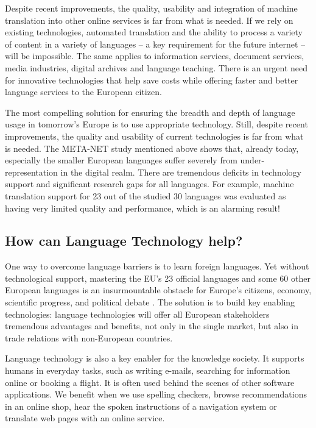 \documentclass[10pt, plain]{../../metanetpaper}
\begin{document}
\begin{multicols}{2}
Despite recent improvements, the quality, usability and integration of machine translation into other online services is far from what is needed. If we rely on existing technologies, automated translation and the ability to process a variety of content in a variety of languages -- a key requirement for the future internet -- will be impossible. The same applies to information services, document services, media industries, digital archives and language teaching. There is an urgent need for innovative technologies that help save costs while offering faster and better language services to the European citizen.

The most compelling solution for ensuring the breadth and depth of language usage in tomorrow's Europe is to use appropriate technology. Still, despite recent improvements, the quality and usability of current technologies is far from what is needed. The META-NET study mentioned above shows that, already today, especially the smaller European languages suffer severely from under-representation in the digital realm. There are tremendous deficits in technology support and significant research gaps for all languages. For example, machine translation support for 23 out of the studied 30 languages was evaluated as having very limited quality and performance, which is an alarming result!

\subsection{How can Language Technology help?}
\label{sec:how-can-language-technology-help}

One way to overcome language barriers is to learn foreign languages. Yet without technological support, mastering the EU's 23 official languages and some 60 other European languages is an insurmountable obstacle for Europe’s citizens, economy, scientific progress, and political debate \cite{ombudsman2012}. The solution is to build key enabling technologies: language technologies will offer all European stakeholders tremendous advantages and benefits, not only in the single market, but also in trade relations with non-European countries.

Language technology is also a key enabler for the knowledge society. It supports humans in everyday tasks, such as writing e-mails, searching for information online or booking a flight. It is often used behind the scenes of other software applications. We benefit when we use spelling checkers, browse recommendations in an online shop, hear the spoken instructions of a navigation system or translate web pages with an online service.


\end{multicols}
\end{document}
